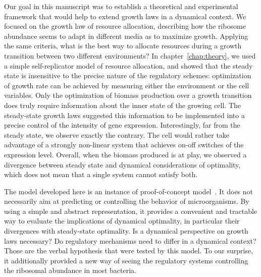 Our goal in this manuscript was to establish a theoretical and experimental framework that would help to extend growth laws in a dynamical context.
We focused on the growth law of resource allocation, describing how the ribosome abundance seems to adapt in different media as to maximize growth.
Applying the same criteria, what is the best way to allocate resources during a growth transition between two different environments?
In chapter~\ref{chap:theory}, we used a simple self-replicator model of resource allocation, and showed that the steady state is insensitive to the precise nature of the regulatory schemes: optimization of growth rate can be achieved by measuring either the environment or the cell variables.
Only the optimization of biomass production over a growth transition does truly require information about the inner state of the growing cell.
The steady-state growth laws suggested this information to be implemented into a precise control of the intensity of gene expression.
Interestingly, far from the steady state, we observe exactly the contrary.
The cell would rather take advantage of a strongly non-linear system that achieves on-off switches of the expression level.
Overall, when the biomass produced is at play, we observed a divergence between steady state and dynamical considerations of optimality, which does not mean that a single system cannot satisfy both.

The model developed here is an instance of proof-of-concept model~\cite{servedio_not_2014}.
It does not necessarily aim at predicting or controlling the behavior of microorganisms.
By using a simple and abstract representation, it provides a convenient and tractable way to evaluate the implications of dynamical optimality, in particular their divergences with steady-state optimality.
Is a dynamical perspective on growth laws necessary?
Do regulatory mechanisms need to differ in a dynamical context?
Those are the verbal hypothesis that were tested by this model.
To our surprise, it additionally provided a new way of seeing the regulatory systems controlling the ribosomal abundance in most bacteria.

